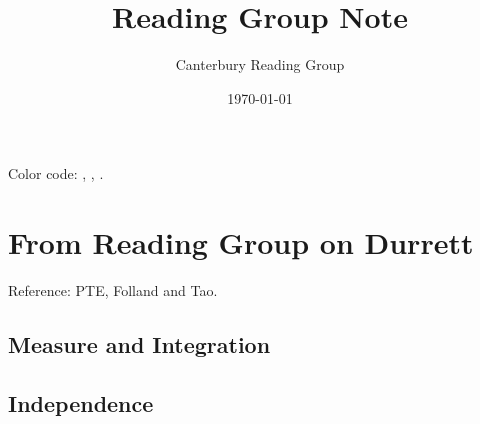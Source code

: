 \documentclass[12pt, oneside]{book}
\begin{document}
    \title{Reading Group Note}\author{Canterbury Reading Group}\date{\today}
    \tableofcontents
    Color code:  , , . 
    \chapter{From Reading Group on Durrett} Reference: PTE, Folland and Tao. 
        \section{Measure and Integration}
        \section{Independence}

\end{document}
